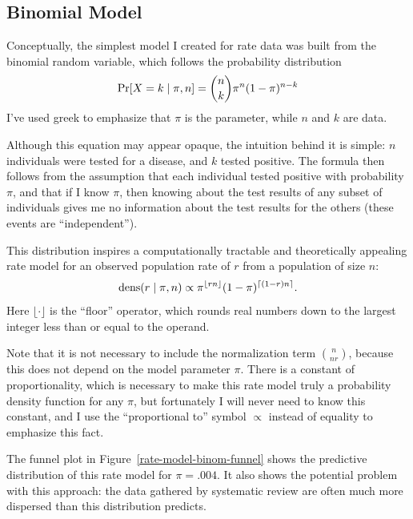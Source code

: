\subsection{Binomial Model}
Conceptually, the simplest model I created for rate data was built
from the binomial random variable, which follows the probability
distribution 
\[
\operatorname{Pr}[X=k\;|\; \pi, n] = \binom{n}{k}\pi^n(1-\pi)^{n-k}
\]
I've used greek to emphasize that $\pi$ is the parameter, while $n$
and $k$ are data.

Although this equation may appear opaque, the intuition behind it is
simple: $n$ individuals were tested for a disease, and $k$ tested
positive. The formula then follows from the assumption that each
individual tested positive with probability $\pi$, and that if I know
$\pi$, then knowing about the test results of any subset of
individuals gives me no information about the test results for the
others (these events are ``independent'').

This distribution inspires a computationally tractable and
theoretically appealing rate model for an observed population rate of
$r$ from a population of size $n$:
\[
\operatorname{dens}(r\;|\; \pi, n) \propto \pi^{\lfloor rn \rfloor}(1-\pi)^{\lceil (1-r)n \rceil}.
\]
Here $\lfloor \cdot \rfloor$ is the ``floor'' operator, which rounds
real numbers down to the largest integer less than or equal to the
operand.

Note that it is not necessary to include the normalization
term $\binom{n}{nr}$, because this does not depend on the model
parameter $\pi$. There is a constant of proportionality, which is
necessary to make this rate model truly a probability density function
for any $\pi$, but fortunately I will never need to know this
constant, and I use the ``proportional to'' symbol $\propto$ instead
of equality to emphasize this fact.

The funnel plot in Figure~\ref{rate-model-binom-funnel} shows the
predictive distribution of this rate model for $\pi=.004$.  It also
shows the potential problem with this approach: the data gathered by
systematic review are often much more dispersed than this distribution
predicts.


